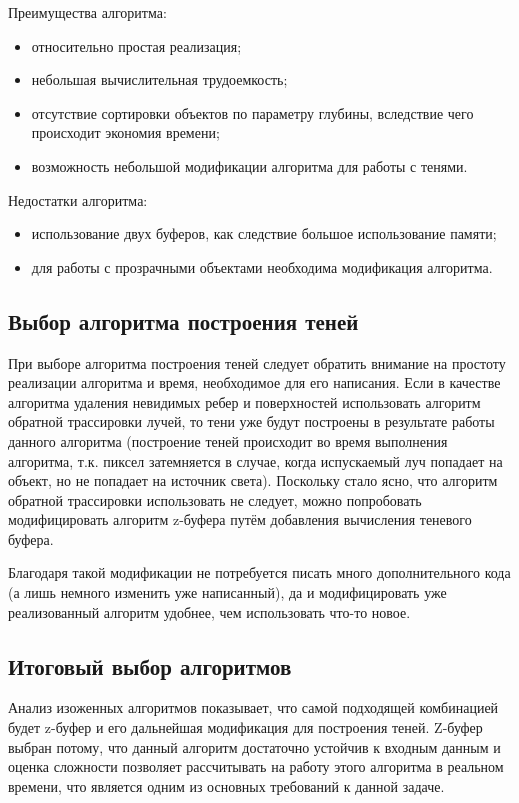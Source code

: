Преимущества алгоритма:
\begin{itemize}[label=---]
    \item относительно простая реализация;
    \item небольшая вычислительная трудоемкость;
    \item отсутствие сортировки объектов по параметру глубины, вследствие чего происходит экономия времени;
    \item возможность небольшой модификации алгоритма для работы с тенями.
\end{itemize}

Недостатки алгоритма:
\begin{itemize}[label=---]
    \item использование двух буферов, как следствие большое использование памяти;
    \item для работы с прозрачными объектами необходима модификация алгоритма.
\end{itemize}

\subsection{Выбор алгоритма построения теней}

При выборе алгоритма построения теней следует обратить внимание на простоту реализации алгоритма и время, необходимое для его написания. Если в качестве алгоритма удаления невидимых ребер и поверхностей использовать алгоритм обратной трассировки лучей, то тени уже будут построены в результате работы данного алгоритма (построение теней происходит во время выполнения алгоритма, т.к. пиксел затемняется в случае, когда испускаемый луч попадает на объект, но не попадает на источник света). Поскольку стало ясно, что алгоритм обратной трассировки использовать не следует, можно попробовать модифицировать алгоритм z-буфера путём добавления вычисления теневого буфера.

Благодаря такой модификации не потребуется писать много дополнительного кода (а лишь немного изменить уже написанный), да и модифицировать уже реализованный алгоритм удобнее, чем использовать что-то новое.

\subsection{Итоговый выбор алгоритмов}

Анализ изоженных алгоритмов показывает, что самой подходящей комбинацией будет z-буфер и его дальнейшая модификация для построения теней. Z-буфер выбран потому, что данный алгоритм достаточно устойчив к входным данным и оценка сложности позволяет рассчитывать на работу этого алгоритма в реальном времени, что является одним из основных требований к данной задаче.

